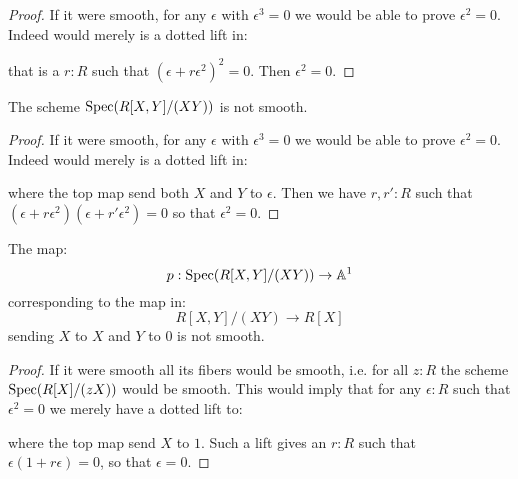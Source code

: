 \begin{proof}
If it were smooth, for any $\epsilon$ with $\epsilon^3=0$ we would be able to prove $\epsilon^2=0$. Indeed would merely is a dotted lift in:
 \begin{center}
    \end{center}
    that is a $r:R$ such that $(\epsilon+r\epsilon^2)^2=0$. Then $\epsilon^2=0$.
\end{proof}

\begin{lemma}
The scheme $\operatorname{Spec}(R[X,Y]/(XY))$ is not smooth.
\end{lemma}

\begin{proof}
If it were smooth, for any $\epsilon$ with $\epsilon^3=0$ we would be able to prove $\epsilon^2=0$. Indeed would merely is a dotted lift in:
 \begin{center}
    \end{center}
    where the top map send both $X$ and $Y$ to $\epsilon$. Then we have $r,r':R$ such that $(\epsilon+r\epsilon^2)(\epsilon+r'\epsilon^2)=0$ so that $\epsilon^2=0$. %
\end{proof}

\begin{lemma}
The map:
\[
p:\operatorname{Spec}(R[X,Y]/(XY))\to \mathbb{A}^1
\] 
corresponding to the map in:
\[
R[X,Y]/(XY) \to R[X]
\]
sending $X$ to $X$ and $Y$ to $0$ is not smooth.
\end{lemma}

\begin{proof}
If it were smooth all its fibers would be smooth, i.e. for all $z:R$ the scheme $\operatorname{Spec}(R[X]/(zX))$ would be smooth. This would imply that for any $\epsilon:R$ such that $\epsilon^2=0$ we merely have a dotted lift to:
 \begin{center}
    \end{center} 
    where the top map send $X$ to $1$. Such a lift gives an $r:R$ such that $\epsilon(1+r\epsilon)=0$, so that $\epsilon=0$.
\end{proof}

